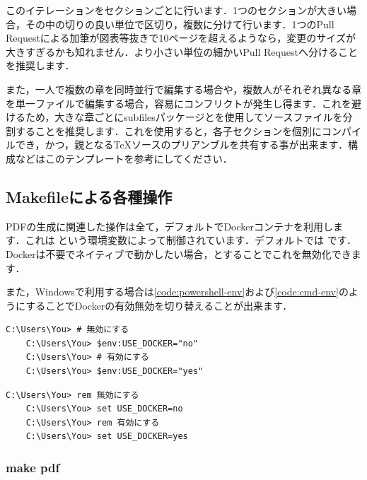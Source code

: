 \documentclass[main]{subfiles}
\begin{document}
このイテレーションをセクションごとに行います．1つのセクションが大きい場合，その中の切りの良い単位で区切り，複数に分けて行います．1つのPull Requestによる加筆が図表等抜きで10ページを超えるようなら，変更のサイズが大きすぎるかも知れません．より小さい単位の細かいPull Requestへ分けることを推奨します．

また，一人で複数の章を同時並行で編集する場合や，複数人がそれぞれ異なる章を単一ファイルで編集する場合，容易にコンフリクトが発生し得ます．これを避けるため，大きな章ごとにsubfilesパッケージとを使用してソースファイルを分割することを推奨します．これを使用すると，各子セクションを個別にコンパイルでき，かつ，親となるTeXソースのプリアンブルを共有する事が出来ます．構成などはこのテンプレートを参考にしてください．

\subsection{Makefileによる各種操作}

PDFの生成に関連した操作は全て，デフォルトでDockerコンテナを利用します．これは  という環境変数によって制御されています．デフォルトでは  です．
Dockerは不要でネイティブで動かしたい場合，とすることでこれを無効化できます．

また，Windowsで利用する場合は\lstlistingname\ref{code:powershell-env}および\lstlistingname\ref{code:cmd-env}のようにすることでDockerの有効無効を切り替えることが出来ます．

\begin{lstlisting}[caption={Powershellの場合},label={code:powershell-env}]
    C:\Users\You> # 無効にする
    C:\Users\You> $env:USE_DOCKER="no"
    C:\Users\You> # 有効にする
    C:\Users\You> $env:USE_DOCKER="yes"
\end{lstlisting}

\begin{lstlisting}[caption={cmd.exeの場合},label={code:cmd-env}]
    C:\Users\You> rem 無効にする
    C:\Users\You> set USE_DOCKER=no
    C:\Users\You> rem 有効にする
    C:\Users\You> set USE_DOCKER=yes
\end{lstlisting}

\subsubsection{make pdf}
\end{document}
